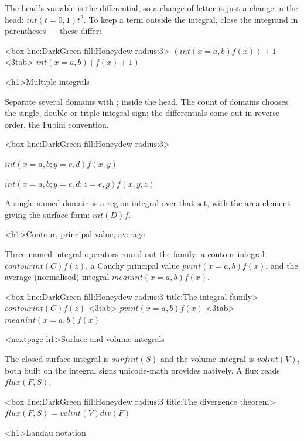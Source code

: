 \documentclass[
  margins=8,
  font=Latin Modern Roman,
  size=12,
  linespread=1.4,
  lang=en
]{scholatex}
\begin{document}
The head's variable is the differential, so a change of letter is just a
change in the head: $int(t=0, 1) t^2$. To keep a term outside the
integral, close the integrand in parentheses — these differ:

<box line:DarkGreen fill:Honeydew radius:3>{
	$(int(x=a, b) f(x)) + 1$ <3tab> $int(x=a, b) (f(x) + 1)$
}

<h1>Multiple integrals

Separate several domains with ; inside the head. The count of
domains chooses the single, double or triple integral sign; the
differentials come out in reverse order, the Fubini convention.

<box line:DarkGreen fill:Honeydew radius:3>{
	$int(x=a, b ; y=c, d) f(x,y)$

	$int(x=a, b ; y=c, d ; z=e, g) f(x,y,z)$
}

A single named domain is a region integral over that set, with the area
element giving the surface form: $int(D) f$.

<h1>Contour, principal value, average

Three named integral operators round out the family: a contour integral
$contourint(C) f(z)$, a Cauchy principal value $pvint(x=a, b) f(x)$, and
the average (normalised) integral $meanint(x=a, b) f(x)$.

<box line:DarkGreen fill:Honeydew radius:3 title:{The integral family}>{
	$contourint(C) f(z)$ <3tab> $pvint(x=a, b) f(x)$ <3tab> $meanint(x=a, b) f(x)$
}

<nextpage h1>Surface and volume integrals

The closed surface integral is $surfint(S)$ and the volume integral is
$volint(V)$, both built on the integral signs unicode-math provides
natively. A flux reads $flux(F, S)$.

<box line:DarkGreen fill:Honeydew radius:3 title:{The divergence theorem}>{
	$flux(F, S) = volint(V) div(F)$
}

<h1>Landau notation
\end{document}
